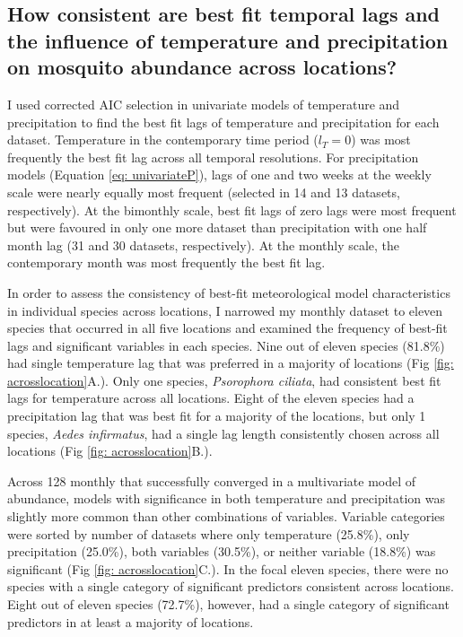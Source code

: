 \subsection{How consistent are best fit temporal lags and the influence of temperature and precipitation on mosquito abundance across locations?}

I used corrected AIC selection in univariate models of temperature and precipitation to find the best fit lags of temperature and precipitation for each dataset. Temperature in the contemporary time period ($l_T = 0$) was most frequently the best fit lag across all temporal resolutions. For precipitation models (Equation \ref{eq: univariateP}), lags of one and two weeks at the weekly scale were nearly equally most frequent (selected in 14 and 13 datasets, respectively). At the bimonthly scale, best fit lags of zero lags were most frequent but were favoured in only one more dataset than precipitation with one half month lag (31 and 30 datasets, respectively). At the monthly scale, the contemporary month was most frequently the best fit lag.

In order to assess the consistency of best-fit meteorological model characteristics in individual species across locations, I narrowed my monthly dataset to eleven species that occurred in all five locations and examined the frequency of best-fit lags and significant variables in each species. Nine out of eleven species (81.8\%) had single temperature lag that was preferred in a majority of locations (Fig \ref{fig: acrosslocation}A.). Only one species, \textit{Psorophora ciliata}, had consistent best fit lags for temperature across all locations. Eight of the eleven species had a precipitation lag that was best fit for a majority of the locations, but only 1 species, \textit{Aedes infirmatus}, had a single lag length consistently chosen across all locations (Fig \ref{fig: acrosslocation}B.).

Across 128 monthly that successfully converged in a multivariate model of abundance, models with significance in both temperature and precipitation was slightly more common than other combinations of variables. Variable categories were sorted by number of datasets where only temperature (25.8\%), only precipitation (25.0\%), both variables (30.5\%), or neither variable (18.8\%) was significant (Fig \ref{fig: acrosslocation}C.). In the focal eleven species, there were no species with a single category of significant predictors consistent across locations. Eight out of eleven species (72.7\%), however, had a single category of significant predictors in at least a majority of locations.  



